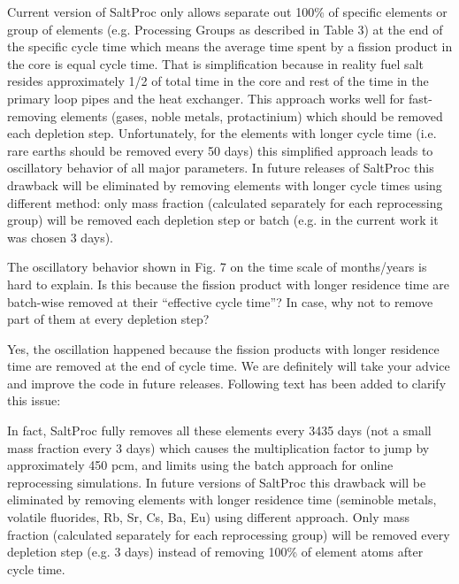\documentclass[answers,11pt]{exam}
\begin{document}
\begin{questions}
\begin{solution}
				Current version of SaltProc only allows separate out 100\% of 
				specific elements or group of elements (e.g. Processing Groups 
				as described in Table 3) at the end
				 of the specific cycle time which means the average time spent 
				by a fission product in the core is equal cycle time. That is 
				simplification because in reality fuel salt resides approximately 
				1/2 of total time in the core and rest of the time in the primary 
				loop pipes and the heat exchanger. This approach works well for 
				fast-removing elements (gases, noble metals, protactinium) which 
				should be removed each depletion step. Unfortunately, for the 
				elements with longer cycle time (i.e. rare earths should be removed 
				every 50 days) this simplified approach leads to oscillatory 
				behavior of all major parameters. In future releases of SaltProc
				 this drawback will be eliminated by removing elements with longer 
				cycle times using different method: only mass fraction (calculated 
				separately for each reprocessing group) will be removed each 
				depletion step or batch (e.g. in the current work it was chosen 
				3 days).	
        \end{solution}


        \question The oscillatory behavior shown in Fig. 7 on the time scale of 
        months/years is hard to explain. Is this because the fission product 
        with longer residence time are batch-wise removed at their ``effective 
        cycle time''? In case, why not to remove part of them at every depletion 
        step?  
        \begin{solution}
                Yes, the oscillation happened because the fission products 
        		with longer residence time are removed at the end of cycle time. We are 
                definitely will take your advice and improve the code in future 
                releases. Following text has been added to clarify this issue:
                
                In fact, SaltProc fully removes all these elements every 3435 days 
                (not a small mass fraction every 3 days) which causes the 
                multiplication factor to jump by approximately 450 pcm, and limits 
                using the batch approach for online reprocessing simulations. In 
                future versions of SaltProc this drawback will be eliminated by 
                removing elements with longer residence time (seminoble metals, 
                volatile fluorides, Rb, Sr, Cs, Ba, Eu) using different approach. 
                Only mass fraction (calculated separately for each reprocessing 
                group) will be removed every depletion step (e.g. 3 days) instead 
                of removing 100\% of element atoms after cycle time.
        \end{solution}


\end{questions}
\end{document}
